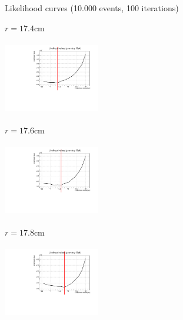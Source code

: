 \documentclass[handout,8 pt]{beamer}
\begin{document}
\begin{frame}{Likelihood curves (10.000 events, 100 iterations)}
\vspace{-5pt}
\begin{minipage}[c]{.32\textwidth}
\begin{exampleblock}{} \begin{center}$r = 17.4$cm\end{center} \end{exampleblock}
\includegraphics[width=4.2cm, height=3.2cm]{figs/likelihood100LowStat/likelihood17p4.pdf} 
\end{minipage}
\begin{minipage}[c]{.32\textwidth}
\begin{exampleblock}{} \begin{center}$r = 17.6$cm\end{center} \end{exampleblock}
\includegraphics[width=4.2cm, height=3.2cm]{figs/likelihood100LowStat/likelihood17p6.pdf} 
\end{minipage}
\begin{minipage}[c]{.32\textwidth}
\begin{exampleblock}{} \begin{center}$r = 17.8$cm\end{center} \end{exampleblock}
\includegraphics[width=4.2cm, height=3.2cm]{figs/likelihood100LowStat/likelihood17p8.pdf} 
\end{minipage}
\end{frame}
\end{document}
